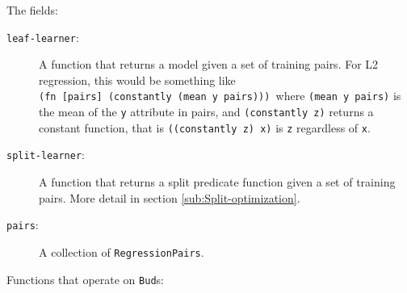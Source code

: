 \documentclass[10pt,openany]{article}
\numberwithin{definition}{section}
\numberwithin{example}{section}
\numberwithin{equation}{section}
\numberwithin{figure}{section}
\begin{document}
The fields:
\begin{description}
\item [{\texttt{leaf-learner}:}] A function that returns a model given
a set of training pairs. For L2 regression, this would be something
like \texttt{(fn~{[}pairs{]}~(constantly~(mean~y~pairs))) }where
\texttt{(mean~y~pairs)} is the mean of the \texttt{y} attribute
in pairs, and \texttt{(constantly~z)} returns a constant function,
that is \texttt{((constantly~z)~x)} is \texttt{z} regardless of
\texttt{x}.
\item [{\texttt{split-learner}:}] A function that returns a split predicate
function given a set of training pairs. More detail in section \ref{sub:Split-optimization}.
\item [{\texttt{pairs}:}] A collection of \texttt{RegressionPairs}.
\end{description}
Functions that operate on \texttt{Bud}s:
\end{document}
